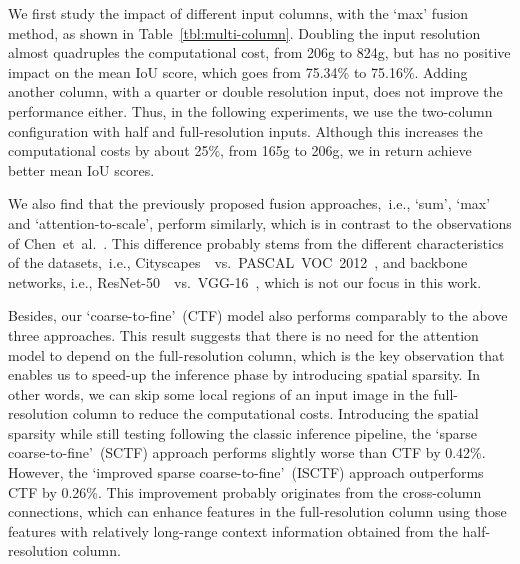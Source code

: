 \documentclass[10pt,twocolumn,letterpaper]{article}
\begin{document}
%

We first study the impact of different input columns, with the `max' fusion method,
as shown in Table~\ref{tbl:multi-column}.
Doubling the input resolution almost quadruples the computational cost, from 206g to 824g,
but has no positive impact on the mean IoU score, which goes from 75.34\% to 75.16\%.
%
Adding another column, with a quarter or double resolution input,
does not improve the performance either.
Thus, in the following experiments, we use the two-column configuration with half and full-resolution inputs.
Although this increases the computational costs by about 25\%, from 165g to 206g,
we in return achieve better mean IoU scores.
%

We also find that the previously proposed fusion approaches,~i.e.,
`sum', `max' and `attention-to-scale', perform similarly,
which is in contrast to the observations of Chen~et~al.~\cite{Attention2Scale.2015.Chen}.
This difference probably stems from the different characteristics of the datasets,~i.e., Cityscapes~\cite{Cityscapes.CVPR.2016.Cordts}~vs.~PASCAL~VOC~2012~\cite{PascalVoc.IJCV.2014.Everingham},
and backbone networks,
i.e., ResNet-50~\cite{ResNet.CVPR.2016.He}~vs.~VGG-16~\cite{VGGNet.2014.Simonyan},
which is not our focus in this work.

Besides, our `coarse-to-fine'~(CTF) model also performs comparably to the above three approaches.
This result suggests that there is no need for the attention model to depend on the full-resolution column,
which is the key observation that enables us to speed-up the inference phase by introducing spatial sparsity.
In other words, we can skip some local regions of an input image in the full-resolution column to reduce the computational costs.
Introducing the spatial sparsity while still testing following the classic inference pipeline,
the `sparse coarse-to-fine'~(SCTF) approach performs slightly worse than CTF by 0.42\%.
However, the `improved sparse coarse-to-fine'~(ISCTF) approach outperforms CTF by 0.26\%.
This improvement probably originates from the cross-column connections,
which can enhance features in the full-resolution column using those features with relatively long-range context information obtained from the half-resolution column.


%
\end{document}

